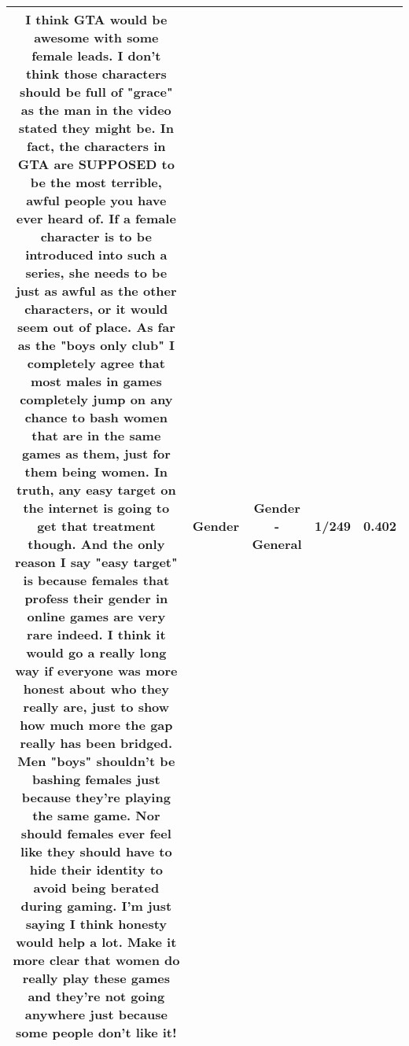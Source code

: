 \documentclass[11pt]{article}
\newlength\mylength
\begin{document}
\begin{center}
\begin{longtable}{|C{.65\mylength}|C{.30\mylength}|C{.12\mylength}|C{.12\mylength}|C{.12\mylength}|}
  \small I think GTA would be awesome with some female leads. I don't think those characters should be full of "grace" as the man in the video stated they might be. In fact, the characters in GTA are SUPPOSED to be the most terrible, awful people you have ever heard of. If a female character is to be introduced into such a series, she needs to be just as awful as the other characters, or it would seem out of place. As far as the "boys only club" I completely agree that most males in games completely jump on any chance to bash women that are in the same games as them, just for them being women. In truth, any easy target on the internet is going to get that treatment though. And the only reason I say "easy target" is because females that profess their \textbf{gender} in online games are very rare indeed. I think it would go a really long way if everyone was more honest about who they really are, just to show how much more the gap really has been bridged. Men "boys" shouldn't be bashing females just because they're playing the same game. Nor should females ever feel like they should have to hide their identity to avoid being berated during gaming. I'm just saying I think honesty would help a lot. Make it more clear that women do really play these games and they're not going anywhere just because some people don't like it!\normalsize   & Gender & Gender - General & 1/249 & 0.402 \\  \hline

\end{longtable}
\end{center}
\end{document}

